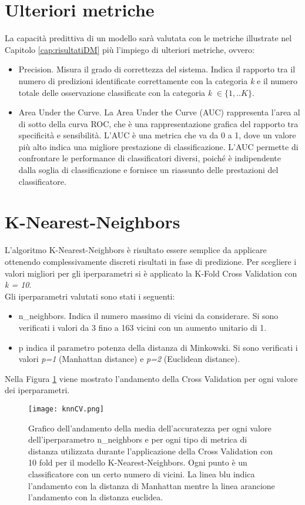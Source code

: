 \section{Ulteriori metriche}
La capacità predittiva di un modello sarà valutata con le metriche illustrate nel Capitolo \ref{cap:risultatiDM} più l'impiego di ulteriori metriche, ovvero:
\begin{itemize}
	\item \textsf{Precision}. Misura il grado di correttezza del sistema. Indica il rapporto tra il numero di predizioni identificate correttamente con la categoria \emph{k} e il numero totale delle osservazione classificate con la categoria \emph{k} $\in \{1,..K\}$.
	\item \textsf{Area Under the Curve}. La Area Under the Curve (AUC) rappresenta l'area al di sotto della curva ROC, che è una rappresentazione grafica del rapporto tra specificità e sensibilità.
	L'AUC è una metrica che va da 0 a 1, dove un valore più alto indica una migliore prestazione di classificazione. L'AUC permette di confrontare le performance di classificatori diversi, poiché è indipendente dalla soglia di classificazione e fornisce un riassunto delle prestazioni del classificatore.
\end{itemize}

\section{K-Nearest-Neighbors}
L'algoritmo K-Nearest-Neighbors è risultato essere semplice da applicare ottenendo complessivamente discreti risultati in fase di predizione. Per scegliere i valori migliori per gli iperparametri si è applicato la K-Fold Cross Validation con \emph{k = 10}.\\
Gli iperparametri valutati sono stati i seguenti:
\begin{itemize}
	\item \textsf{n\_neighbors}. Indica il numero massimo di vicini da considerare. Si sono verificati i valori da 3 fino a 163 vicini con un aumento unitario di 1.
	\item \textsf{p} indica il parametro potenza della distanza di Minkowski. Si sono verificati i valori \emph{p=1} (Manhattan distance) e \emph{p=2} (Euclidean distance).
\end{itemize}

Nella Figura \ref{fig:knnCV} viene mostrato l'andamento della Cross Validation per ogni valore dei iperparametri.
\begin{figure}[h]
	\begin{center}
		\texttt{[image: knnCV.png]}
		\caption{Grafico dell'andamento della media dell'accuratezza per ogni valore dell'iperparametro \textsf{n\_neighbors} e per ogni tipo di metrica di distanza utilizzata durante l'applicazione della Cross Validation con 10 fold per il modello K-Nearest-Neighbors. Ogni punto è un classificatore con un certo numero di vicini. La linea blu indica l'andamento con la distanza di Manhattan mentre la linea arancione l'andamento con la distanza euclidea.
		} 
		\label{fig:knnCV}
	\end{center}
\end{figure}


